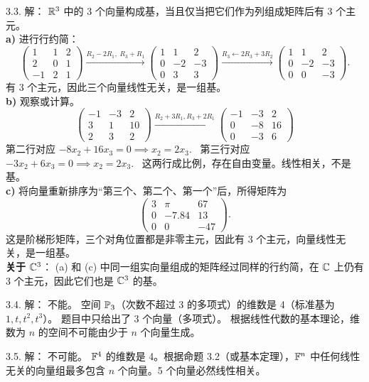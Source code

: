 \begin{exer}
3.3. 解：
$\mathbb{R}^3$ 中的 3 个向量构成基，当且仅当把它们作为列组成矩阵后有 3 个主元。
\\
\textbf{a)} 进行行约简：
$$
\begin{pmatrix} 1 & 1 & 2 \\ 2 & 0 & 1 \\ -1 & 2 & 1 \end{pmatrix}
\xrightarrow{R_2-2R_1,\;R_3+R_1}
\begin{pmatrix} 1 & 1 & 2 \\ 0 & -2 & -3 \\ 0 & 3 & 3 \end{pmatrix}
\xrightarrow{R_3\leftarrow 2R_3+3R_2}
\begin{pmatrix} 1 & 1 & 2 \\ 0 & -2 & -3 \\ 0 & 0 & -3 \end{pmatrix}.
$$
有 3 个主元，因此三个向量线性无关，是一组基。
\\
\textbf{b)} 观察或计算。
$$ \begin{pmatrix} -1 & -3 & 2 \\ 3 & 1 & 10 \\ 2 & 3 & 2 \end{pmatrix} \xrightarrow{R_2+3R_1, R_3+2R_1} \begin{pmatrix} -1 & -3 & 2 \\ 0 & -8 & 16 \\ 0 & -3 & 6 \end{pmatrix} $$
第二行对应 $-8x_2 + 16x_3 = 0 \implies x_2 = 2x_3$.~
第三行对应 $-3x_2 + 6x_3 = 0 \implies x_2 = 2x_3$.~
这两行成比例，存在自由变量。线性相关，不是基。
\\
\textbf{c)} 将向量重新排序为“第三个、第二个、第一个”后，所得矩阵为
$$ \begin{pmatrix} 3 & \pi & 67 \\ 0 & -7.84 & 13 \\ 0 & 0 & -47 \end{pmatrix}. $$
这是阶梯形矩阵，三个对角位置都是非零主元，因此有 3 个主元，向量线性无关，是一组基。
\\
\textbf{关于 $\mathbb{C}^3$}：
(a) 和 (c) 中同一组实向量组成的矩阵经过同样的行约简，在 $\mathbb{C}$ 上仍有 3 个主元，因此它们也是 $\mathbb{C}^3$ 的基。

3.4. 解：
不能。
空间 $\mathbb{P}_3$（次数不超过 3 的多项式）的维数是 4（标准基为 $1, t, t^2, t^3$）。
题目中只给出了 3 个向量（多项式）。
根据线性代数的基本理论，维数为 $n$ 的空间不可能由少于 $n$ 个向量生成。

3.5. 解：
不可能。
$\mathbb{F}^4$ 的维数是 4。根据命题 3.2（或基本定理），$\mathbb{F}^n$ 中任何线性无关的向量组最多包含 $n$ 个向量。5 个向量必然线性相关。


\end{exer}
